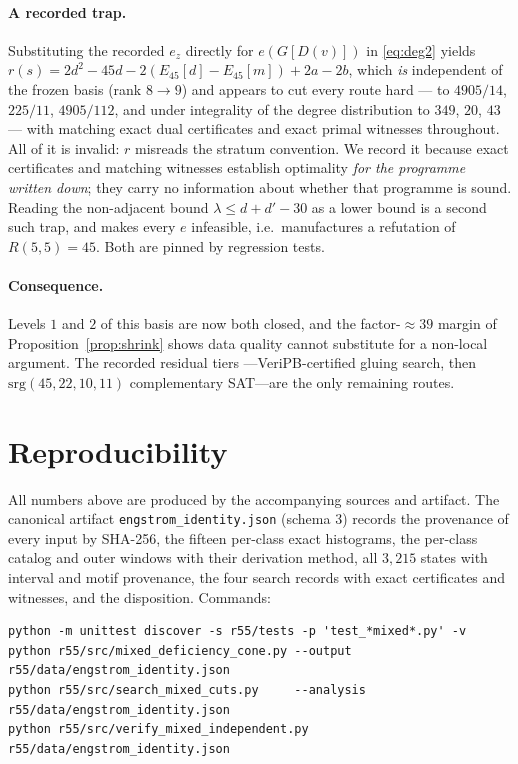 \documentclass[11pt]{article}
\theoremstyle{definition}
\begin{document}
\paragraph{A recorded trap.} Substituting the recorded $e_z$ directly for
$e(G[D(v)])$ in \eqref{eq:deg2} yields
$r(s)=2d^2-45d-2(E_{45}[d]-E_{45}[m])+2a-2b$, which \emph{is} independent of the
frozen basis (rank $8\to9$) and appears to cut every route hard --- to
$4905/14$, $225/11$, $4905/112$, and under integrality of the degree
distribution to $349$, $20$, $43$ --- with matching exact dual certificates and
exact primal witnesses throughout. All of it is invalid: $r$ misreads the
stratum convention. We record it because exact certificates and matching
witnesses establish optimality \emph{for the programme written down}; they carry
no information about whether that programme is sound. Reading the non-adjacent
bound $\lambda\le d+d'-30$ as a lower bound is a second such trap, and makes
every $e$ infeasible, i.e.\ manufactures a refutation of $R(5,5)=45$. Both are
pinned by regression tests.

\paragraph{Consequence.} Levels $1$ and $2$ of this basis are now both closed,
and the factor-$\approx39$ margin of Proposition~\ref{prop:shrink} shows data
quality cannot substitute for a non-local argument. The recorded residual tiers
---VeriPB-certified gluing search, then $\mathrm{srg}(45,22,10,11)$
complementary SAT---are the only remaining routes.

\section{Reproducibility}

All numbers above are produced by the accompanying sources and artifact.
The canonical artifact \texttt{engstrom\_identity.json} (schema 3) records the
provenance of every input by SHA-256, the fifteen per-class exact histograms,
the per-class catalog and outer windows with their derivation method, all
$3{,}215$ states with interval and motif provenance, the four search records
with exact certificates and witnesses, and the disposition. Commands:

\begin{verbatim}
python -m unittest discover -s r55/tests -p 'test_*mixed*.py' -v
python r55/src/mixed_deficiency_cone.py --output r55/data/engstrom_identity.json
python r55/src/search_mixed_cuts.py     --analysis r55/data/engstrom_identity.json
python r55/src/verify_mixed_independent.py       r55/data/engstrom_identity.json
\end{verbatim}
\end{document}
